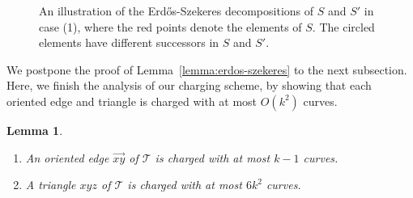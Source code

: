 \documentclass[11pt]{amsart}
\newtheorem{lemma}[theorem]{Lemma}
\theoremstyle{definition}
\newcommand{\cT}{\mathcal{T}}
\begin{document}
\begin{figure}[htbp]
\caption{An illustration of the Erd\H{o}s-Szekeres decompositions of $S$ and $S'$ in case (1), where the red points denote the elements of $S$. The circled elements have different successors in $S$ and $S'$.}
\label{fig:successor-changes}
\end{figure}


We postpone the proof of Lemma~\ref{lemma:erdos-szekeres} to the next subsection.
Here, we  finish the analysis of our charging scheme, by showing that each oriented edge and triangle is charged with at most $O(k^2)$ curves.
\begin{lemma}\label{lemma:charging_edges}
\begin{enumerate}
  \item[(a)] An oriented edge $\vec{xy}$ of $\cT$ is charged with at most $k-1$ curves.
  \item[(b)] A triangle $xyz$ of $\cT$ is charged with at most $6k^2$ curves.
\end{enumerate}
\end{lemma}
\end{document}
